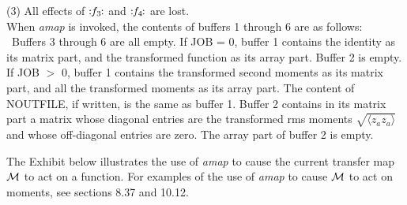 (3)  All effects of $\Lieop(f_3)$ and $\Lieop(f_4)$ are lost. \\

When {\em amap} is invoked, the contents of buffers 1 through 6 are as follows: \ Buffers 3 through 6 are all empty.  If JOB = 0, buffer 1 contains the identity as its matrix part, and the
transformed function as its array part.  Buffer 2 is empty.  If JOB $>$ 0, buffer 1
contains the transformed second moments as its matrix part, and all the transformed moments
as its array part.  The content of NOUTFILE, if written, is the same as buffer 1.  Buffer 2 contains in its matrix part a matrix whose diagonal
entries are the transformed rms moments $\sqrt{\langle z_az_a\rangle}$ and whose
off-diagonal entries are zero.  The array part of buffer 2 is empty.


The Exhibit below illustrates the use of {\em amap} to cause the current transfer map ${\cal M}$ to act on a function.  For examples of the use of {\em amap} to cause ${\cal M}$ to act on moments, see sections 8.37 and 10.12.


